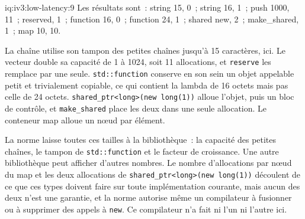 \begin{solution}{iq:iv3:low-latency:9}
Les résultats sont~: string 15, 0~; string 16, 1~; push 1000, 11~; reserved, 1~; function 16, 0~; function 24, 1~; shared new, 2~; make\_shared, 1~; map 10, 10.

La chaîne utilise son tampon des petites chaînes jusqu'à 15 caractères, ici. Le vecteur double sa capacité de 1 à 1024, soit 11 allocations, et \texttt{reserve} les remplace par une seule. \texttt{std::function} conserve en son sein un objet appelable petit et trivialement copiable, ce qui contient la lambda de 16 octets mais pas celle de 24 octets. \texttt{shared\_ptr<long>(new long(1))} alloue l'objet, puis un bloc de contrôle, et \texttt{make\_shared} place les deux dans une seule allocation. Le conteneur map alloue un nœud par élément.

La norme laisse toutes ces tailles à la bibliothèque~: la capacité des petites chaînes, le tampon de \texttt{std::function} et le facteur de croissance. Une autre bibliothèque peut afficher d'autres nombres. Le nombre d'allocations par nœud du map et les deux allocations de \texttt{shared\_ptr<long>(new long(1))} découlent de ce que ces types doivent faire sur toute implémentation courante, mais aucun des deux n'est une garantie, et la norme autorise même un compilateur à fusionner ou à supprimer des appels à \texttt{new}. Ce compilateur n'a fait ni l'un ni l'autre ici.

\end{solution}

